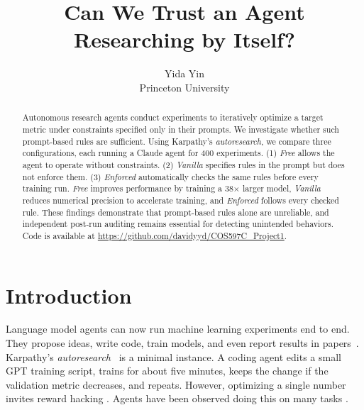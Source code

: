 \documentclass{article}
\title{Can We Trust an Agent Researching by Itself?}
\author{Yida Yin \\
Princeton University}
\begin{document}
\maketitle
{}   %

\begin{abstract}
Autonomous research agents conduct experiments to iteratively optimize a target metric under constraints specified only in their prompts. We investigate whether such prompt-based rules are sufficient. Using Karpathy's \emph{autoresearch}, we compare three configurations, each running a Claude agent for 400 experiments. (1) \emph{Free} allows the agent to operate without constraints. (2) \emph{Vanilla} specifies rules in the prompt but does not enforce them. (3) \emph{Enforced} automatically checks the same rules before every training run. \emph{Free} improves performance by training a 38$\times$ larger model, \emph{Vanilla} reduces numerical precision to accelerate training, and \emph{Enforced} follows every checked rule. These findings demonstrate that prompt-based rules alone are unreliable, and independent post-run auditing remains essential for detecting unintended behaviors. Code is available at \url{https://github.com/davidyyd/COS597C_Project1}.
\end{abstract}

\section{Introduction}

Language model agents can now run machine learning experiments end to end. They propose ideas, write code, train
models, and even report results in papers~\citep{lu2024aiscientist,yamada2025aiscientistv2,novikov2025alphaevolve,gottweis2026coscientist}.
Karpathy's \emph{autoresearch}~\citep{karpathy2026autoresearch} is a minimal instance. A coding agent edits a
small GPT training script, trains for about five minutes, keeps the change if the validation metric decreases, and repeats. However, optimizing a single number invites reward hacking
\citep{amodei2016concrete,manheim2018goodhart,skalse2022rewardhacking}. Agents have been observed doing this on
many tasks \citep{metr2025rewardhacking,zhong2025impossiblebench,huang2026rewardhackingresearch}.
\end{document}
